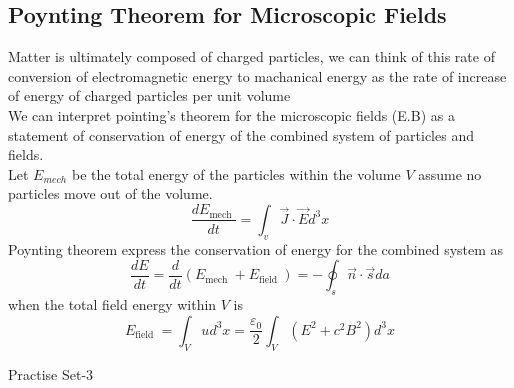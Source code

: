 \subsection{Poynting Theorem for Microscopic Fields}
Matter is ultimately composed of charged particles, we can think of this rate of conversion of electromagnetic energy to machanical energy as the rate of increase of energy of charged particles per unit volume\\
We can interpret pointing's theorem for the microscopic fields (E.B) as a statement of conservation of energy of the combined system of particles and fields.\\
Let $E_{mech}$ be the total energy of the particles within the volume $V$ assume no particles move out of the volume.
$$\frac{d E_{\text {mech }}}{d t}=\int_{v} \vec{J} \cdot \vec{E} d^{3} x$$
Poynting theorem express the conservation of energy for the combined system as
$$\frac{d E}{d t}=\frac{d}{d t}\left(E_{\text {mech }}+E_{\text {field }}\right)=-\oint_{s} \vec{n} \cdot \vec{s} d a$$
when the total field energy within $V$ is
$$E_{\text {field } }=\int_{V} u d^{3} x=\frac{\varepsilon_{0}}{2} \int_{V}\left(E^{2}+c^{2} B^{2}\right) d^{3} x$$
\newpage
\begin{abox}
	Practise Set-3
\end{abox}
